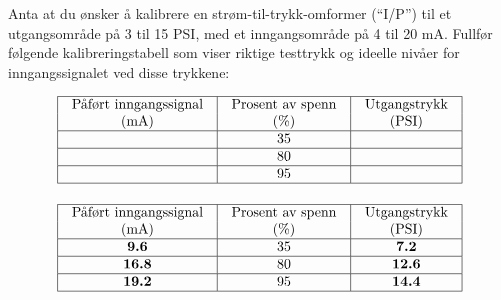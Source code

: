 
Anta at du ønsker å kalibrere en strøm-til-trykk-omformer (``I/P'') til et utgangsområde på 3 til 15 PSI, med et inngangsområde på 4 til 20 mA. Fullfør følgende kalibreringstabell som viser riktige testtrykk og ideelle nivåer for inngangssignalet ved disse trykkene:


$$\vbox{\offinterlineskip
\halign{\strut
\vrule \quad\hfil # \ \hfil & 
\vrule \quad\hfil # \ \hfil & 
\vrule \quad\hfil # \ \hfil \vrule \cr
\noalign{\hrule}
%
Påført inngangssignal & Prosent av spenn & Utgangstrykk \cr
%
(mA) & (\%) & (PSI) \cr
%
\noalign{\hrule}
%
 & 35 &  \cr
%
\noalign{\hrule}
%
 & 80 &  \cr
%
\noalign{\hrule}
%
 & 95 &  \cr
%
\noalign{\hrule}
} %
}$$ %








$$\vbox{\offinterlineskip
\halign{\strut
\vrule \quad\hfil # \ \hfil & 
\vrule \quad\hfil # \ \hfil & 
\vrule \quad\hfil # \ \hfil \vrule \cr
\noalign{\hrule}
%
Påført inngangssignal & Prosent av spenn & Utgangstrykk \cr
%
(mA) & (\%) & (PSI) \cr
%
\noalign{\hrule}
%
{\bf 9.6} & 35 & {\bf 7.2} \cr
%
\noalign{\hrule}
%
{\bf 16.8} & 80 & {\bf 12.6} \cr
%
\noalign{\hrule}
%
{\bf 19.2} & 95 & {\bf 14.4} \cr
%
\noalign{\hrule}
} %
}$$ %









